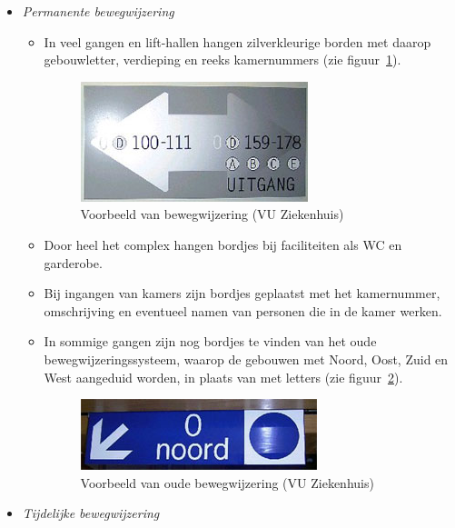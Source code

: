 \begin{itemize}

\item \emph{Permanente bewegwijzering}

\begin{itemize}
\item In veel gangen en lift-hallen hangen zilverkleurige borden met daarop gebouwletter, verdieping en reeks kamernummers (zie figuur~\ref{figuur:vu_nieuw}).

\begin{figure}
\begin{center}
\includegraphics{images/vu_nieuw.jpg}
\end{center}
\caption{Voorbeeld van bewegwijzering (VU Ziekenhuis)}
\label{figuur:vu_nieuw}
\end{figure}

\item Door heel het complex hangen bordjes bij faciliteiten als WC en garderobe.
\item Bij ingangen van kamers zijn bordjes geplaatst met het kamernummer, omschrijving en eventueel namen van personen die in de kamer werken.
\item In sommige gangen zijn nog bordjes te vinden van het oude bewegwijzeringssysteem, waarop de gebouwen met Noord, Oost, Zuid en West aangeduid worden, in plaats van met letters (zie figuur~\ref{figuur:vu_oud}).

\begin{figure}
\begin{center}
\includegraphics{images/vu_oud.jpg}
\end{center}
\caption{Voorbeeld van oude bewegwijzering (VU Ziekenhuis)}
\label{figuur:vu_oud}
\end{figure}

\end{itemize}

\item \emph{Tijdelijke bewegwijzering}


\end{itemize}
